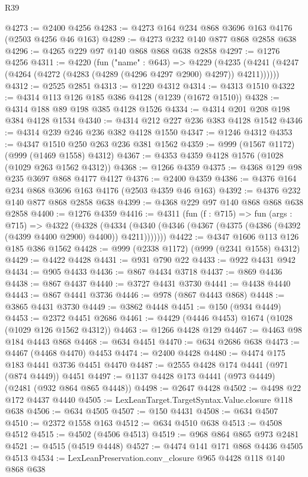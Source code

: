 \begin{lexlean}{R39}
\begin{coremodule}
@4273 := @2400 @4256
@4283 := @4273 @164 @234 @868 @3696 @163 @4176 (@2503 @4256 @46 @163)
@4289 := @4273 @232 @140 @877 @868 @2858 @638
@4296 := @4265 @229 @97 @140 @868 @868 @638 @2858
@4297 := @1276 @4256
@4311 := @4220
    (fun ("name" : @643) =>
    @4229 (@4235 (@4241 (@4247 (@4264 (@4272 (@4283 (@4289 (@4296 @4297 @2900) @4297)) @4211))))))
@4312 := @2525 @2851
@4313 := @1220 @4312
@4314 := @4313 @1510
@4322 := @4314 @113 @126 @185 @386 @4128 (@1239 (@1672 @1510))
@4328 := @4314 @188 @89 @198 @385 @4128 @1526
@4334 := @4314 @201 @208 @198 @384 @4128 @1534
@4340 := @4314 @212 @227 @236 @383 @4128 @1542
@4346 := @4314 @239 @246 @236 @382 @4128 @1550
@4347 := @1246 @4312
@4353 := @4347 @1510 @250 @263 @236 @381 @1562
@4359 := @999 (@1567 @1172) (@999 (@1469 @1558) @4312)
@4367 := @4353 @4359 @4128 @1576 (@1028 (@1029 @263 @1562 @4312))
@4368 := @1266 @4359
@4375 := @4368 @129 @98 @235 @3697 @868 @4177 @4127
@4376 := @2400 @4359
@4386 := @4376 @164 @234 @868 @3696 @163 @4176 (@2503 @4359 @46 @163)
@4392 := @4376 @232 @140 @877 @868 @2858 @638
@4399 := @4368 @229 @97 @140 @868 @868 @638 @2858
@4400 := @1276 @4359
@4416 := @4311
    (fun (f : @715) =>
    fun (args : @715) =>
    @4322
      (@4328
        (@4334 (@4340 (@4346 (@4367 (@4375 (@4386 (@4392 (@4399 @4400 @2900) @4400)) @4211)))))))
@4422 := @4347 @1606 @113 @126 @185 @386 @1562
@4428 := @999 (@2338 @1172) (@999 (@2341 @1558) @4312)
@4429 := @4422 @4428
@4431 := @931 @790 @22
@4433 := @922 @4431 @942
@4434 := @905 @4433
@4436 := @867 @4434 @3718
@4437 := @869 @4436
@4438 := @867 @4437
@4440 := @3727 @4431 @3730
@4441 := @4438 @4440
@4443 := @867 @4441 @3736
@4446 := @978 (@867 @4443 @868)
@4448 := @3865 @4431 @3730
@4449 := @3862 @4448
@4451 := @150 (@934 @4449)
@4453 := @2372 @4451 @2686
@4461 := @4429 (@4446 @4453) @1674 (@1028 (@1029 @126 @1562 @4312))
@4463 := @1266 @4428 @129
@4467 := @4463 @98 @184 @4443 @868
@4468 := @634 @4451
@4470 := @634 @2686 @638
@4473 := @4467 (@4468 @4470) @4453
@4474 := @2400 @4428
@4480 := @4474 @175 @183 @4441 @3736 @4451 @4470
@4487 := @2555 @4428 @174 @4441 (@971 (@874 @4449)) @4451
@4497 := @1137 @4428 @173 @4441 (@973 @4449) (@2481 (@932 @864 @865 @4448))
@4498 := @2647 @4428
@4502 := @4498 @22 @172 @4437 @4440
@4505 := LexLeanTarget.TargetSyntax.Value.closure @118 @638
@4506 := @634 @4505
@4507 := @150 @4431
@4508 := @634 @4507
@4510 := @2372 @1558 @163
@4512 := @634 @4510 @638
@4513 := @4508 @4512
@4515 := @4502 (@4506 @4513)
@4519 := @968 @864 @865 @973 @2481
@4521 := @4515 (@4519 @4448)
@4527 := @4474 @141 @171 @868 @4436 @4505 @4513
@4534 := LexLeanPreservation.conv_closure @965 @4428 @118 @140 @868 @638

\end{coremodule}
\end{lexlean}
